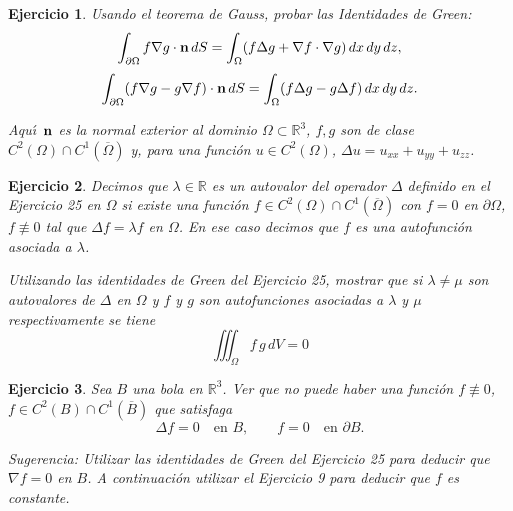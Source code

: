 \documentclass[11pt,a4paper,pdftex]{amsart}
\newtheorem{ej}{Ejercicio}%
\newcommand{\bej}[1]{\begin{ej}\rm{#1}}
\newcommand{\eej}{\end{ej}\vspace{-0.2cm}}
\renewcommand{\bf}{\textbf}
\newcommand{\R}{\mathbb R}
\newcommand{\0}{\mathbb O}
\newcommand{\8}{\infty}
\begin{document}
%

\bej Usando el teorema de Gauss, probar las {\it Identidades de Green}:
\[
\int_{\partial \Omega }f\nabla g\cdot {\bf n}\,dS=\int_\Omega (f\Delta
g+\nabla f\cdot \nabla g)\,dx\,dy\,dz,
\]
\[
\int_{\partial \Omega }(f\nabla g-g\nabla f)\cdot {\bf n}\,dS=\int_\Omega
(f\Delta g-g\Delta f)\,dx\,dy\,dz.
\]

Aqu\'{\i }{\ }${\bf n}$ es la normal exterior al dominio $\Omega \subset
\R^3$,  $f,g$ son de clase $C^2({\Omega})\cap C^1(\overline{\Omega})$ y, para 
una función $u\in C^2(\Omega)$, $\Delta u=u_{xx}+u_{yy}+u_{zz}$.
\eej

\bej Decimos que $\lambda\in\R$ es un autovalor del operador $\Delta$ definido en el
Ejercicio 25 en $\Omega$ si existe una función $f\in C^2(\Omega)\cap C^1(\overline{\Omega})$
con $f=0$ en $\partial \Omega$, $f\not\equiv0$ tal que $\Delta f=\lambda f$ en
$\Omega$. En ese caso decimos que $f$ es una autofunción asociada a $\lambda$.

 Utilizando las identidades de Green del Ejercicio 25, mostrar que si $\lambda\neq\mu$ son
autovalores de $\Delta$ en $\Omega$ y $f$ y $g$ son autofunciones asociadas
a $\lambda$ y $\mu$ respectivamente se tiene
$$\iiint_\Omega f\,g\,dV=0
$$
\eej

\bej Sea $B$ una bola en $\mathbb{R}^3$. Ver que no puede haber una función $f\not\equiv0$, $f\in C^2(B)\cap C^1(\overline{B})$
que satisfaga
$$
\Delta f=0\quad\mbox{en }B,\qquad f=0\quad\mbox{en }\partial B.
$$

\medskip

Sugerencia: Utilizar las identidades de Green del Ejercicio 25 para deducir que $\nabla f=0$ en $B$.
A continuación utilizar el Ejercicio 9 para deducir que $f$ es constante.
\eej
\end{document}
